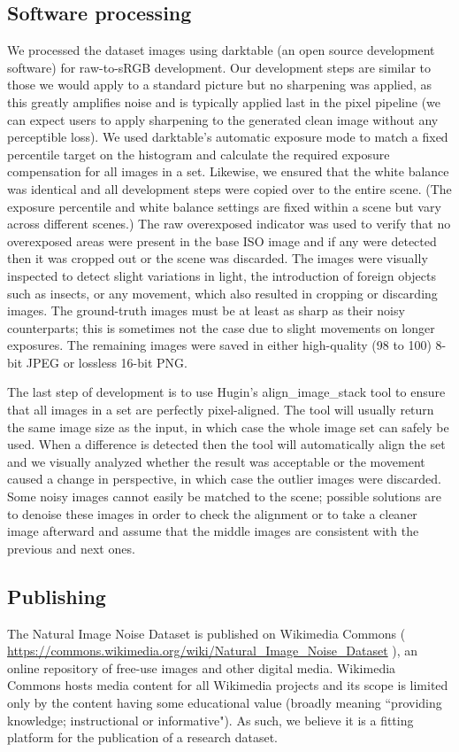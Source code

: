 \subsection{Software processing}
We processed the dataset images using darktable \cite{darktable} (an open source development software) for raw-to-sRGB development. Our development steps are similar to those we would apply to a standard picture but no sharpening was applied, as this greatly amplifies noise and is typically applied last in the pixel pipeline (we can expect users to apply sharpening to the generated clean image without any perceptible loss). We used darktable's automatic exposure mode to match a fixed percentile target on the histogram and calculate the required exposure compensation for all images in a set. Likewise, we ensured that the white balance was identical and all development steps were copied over to the entire scene. (The exposure percentile and white balance settings are fixed within a scene but vary across different scenes.) The raw overexposed indicator was used to verify that no overexposed areas were present in the base ISO image and if any were detected then it was cropped out or the scene was discarded. The images were visually inspected to detect slight variations in light, the introduction of foreign objects such as insects, or any movement, which also resulted in cropping or discarding images. The ground-truth images must be at least as sharp as their noisy counterparts; this is sometimes not the case due to slight movements on longer exposures. The remaining images were saved in either high-quality (98 to 100) 8-bit JPEG or lossless 16-bit PNG.

The last step of development is to use Hugin's align\_image\_stack tool \cite{hugin} to ensure that all images in a set are perfectly pixel-aligned. The tool will usually return the same image size as the input, in which case the whole image set can safely be used. When a difference is detected then the tool will automatically align the set and we visually analyzed whether the result was acceptable or the movement caused a change in perspective, in which case the outlier images were discarded. Some noisy images cannot easily be matched to the scene; possible solutions are to denoise these images in order to check the alignment or to take a cleaner image afterward and assume that the middle images are consistent with the previous and next ones.
\subsection{Publishing}
The Natural Image Noise Dataset is published on Wikimedia Commons ( \url{https://commons.wikimedia.org/wiki/Natural_Image_Noise_Dataset} ), an online repository of free-use images and other digital media. Wikimedia Commons hosts media content for all Wikimedia projects and its scope is limited only by the content having some educational value (broadly meaning ``providing knowledge; instructional or informative"). As such, we believe it is a fitting platform for the publication of a research dataset.

